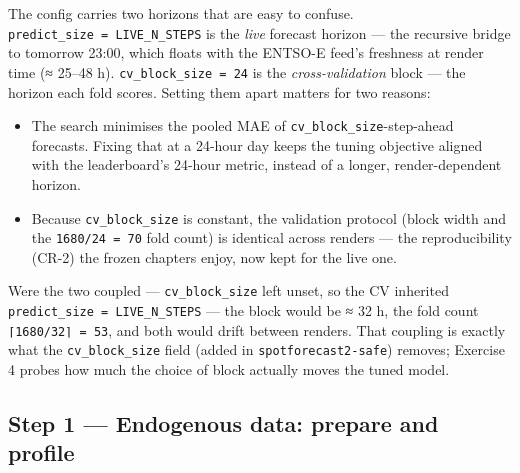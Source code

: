 \documentclass[
  english,
  letterpaper,
]{scrbook}
\providecommand{\tightlist}{%
  \setlength{\itemsep}{0pt}\setlength{\parskip}{0pt}}
\begin{document}
\begin{tcolorbox}[enhanced jigsaw, arc=.35mm, bottomrule=.15mm, bottomtitle=1mm, breakable, colback=white, colbacktitle=quarto-callout-note-color!10!white, colframe=quarto-callout-note-color-frame, coltitle=black, left=2mm, leftrule=.75mm, opacityback=0, opacitybacktitle=0.6, rightrule=.15mm, title=\textcolor{quarto-callout-note-color}{\faInfo}\hspace{0.5em}{Why \texttt{cv\_block\_size} is a separate knob}, titlerule=0mm, toprule=.15mm, toptitle=1mm]

The config carries two horizons that are easy to confuse.
\texttt{predict\_size\ =\ LIVE\_N\_STEPS} is the \emph{live} forecast
horizon --- the recursive bridge to tomorrow 23:00, which floats with
the ENTSO-E feed's freshness at render time (≈ 25--48 h).
\texttt{cv\_block\_size\ =\ 24} is the \emph{cross-validation} block ---
the horizon each fold scores. Setting them apart matters for two
reasons:

\begin{itemize}
\tightlist
\item
  The search minimises the pooled MAE of
  \texttt{cv\_block\_size}-step-ahead forecasts. Fixing that at a
  24-hour day keeps the tuning objective aligned with the leaderboard's
  24-hour metric, instead of a longer, render-dependent horizon.
\item
  Because \texttt{cv\_block\_size} is constant, the validation protocol
  (block width and the \texttt{1680/24\ =\ 70} fold count) is identical
  across renders --- the reproducibility (CR-2) the frozen chapters
  enjoy, now kept for the live one.
\end{itemize}

Were the two coupled --- \texttt{cv\_block\_size} left unset, so the CV
inherited \texttt{predict\_size\ =\ LIVE\_N\_STEPS} --- the block would
be ≈ 32 h, the fold count \texttt{⌈1680/32⌉\ =\ 53}, and both would
drift between renders. That coupling is exactly what the
\texttt{cv\_block\_size} field (added in \texttt{spotforecast2-safe})
removes; Exercise 4 probes how much the choice of block actually moves
the tuned model.

\end{tcolorbox}

\subsection{Step 1 --- Endogenous data: prepare and
profile}\label{sec-team4-prepare}
\end{document}
